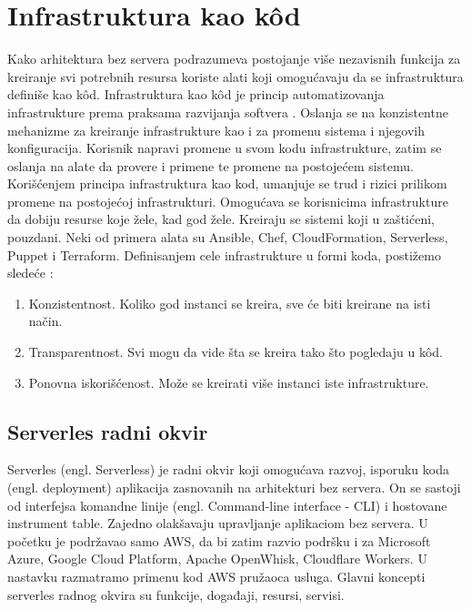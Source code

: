 \documentclass[12pt,oneside]{memoir}
\begin{document}
\section{Infrastruktura kao kôd}
Kako arhitektura bez servera podrazumeva postojanje više nezavisnih funkcija za kreiranje svi potrebnih resursa koriste alati koji omogućavaju da se infrastruktura definiše kao kôd. Infrastruktura kao kôd je princip automatizovanja infrastrukture prema praksama razvijanja softvera \cite{iac}. Oslanja se na konzistentne mehanizme za kreiranje infrastrukture kao i za promenu sistema i njegovih konfiguracija. Korisnik napravi promene u svom kodu infrastrukture, zatim se oslanja na alate da provere i primene te promene na postojećem sistemu. Korišćenjem principa infrastruktura kao kod, umanjuje se trud i rizici prilikom promene na postojećoj infrastrukturi. Omogućava se korisnicima infrastrukture da dobiju resurse koje žele, kad god žele. Kreiraju se sistemi koji u zaštićeni, pouzdani. Neki od primera alata su Ansible, Chef, CloudFormation, Serverless, Puppet i Terraform. Definisanjem cele infrastrukture u formi koda, postižemo sledeće \cite{iac}:
\begin{enumerate}
  \item Konzistentnost. Koliko god instanci se kreira, sve će biti kreirane na isti način.
  \item Transparentnost. Svi mogu da vide šta se kreira tako što pogledaju u kôd.
  \item Ponovna iskorišćenost. Može se kreirati više instanci iste infrastrukture.
\end{enumerate}
 
\subsection{Serverles radni okvir}
 
Serverles (engl. Serverless) je radni okvir koji omogućava razvoj, isporuku koda (engl. deployment) aplikacija zasnovanih na arhitekturi bez servera. On se sastoji od interfejsa komandne linije (engl. Command-line interface - CLI) i hostovane instrument table. Zajedno olakšavaju upravljanje aplikaciom bez servera. U početku je podržavao samo AWS, da bi zatim razvio podršku i za Microsoft Azure, Google Cloud Platform, Apache OpenWhisk, Cloudflare Workers. U nastavku razmatramo primenu kod AWS pružaoca usluga. Glavni koncepti serverles radnog okvira su funkcije, događaji, resursi, servisi. 
 
\end{document}
